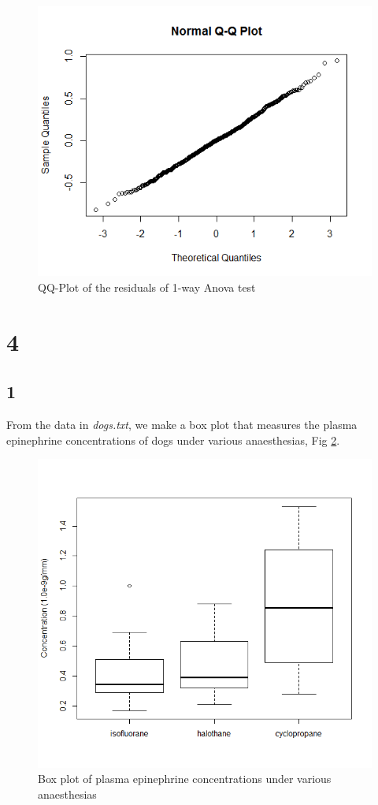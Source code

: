 \documentclass{article}
\begin{document}
    \begin{figure}[H]
    \centering
      \includegraphics[scale=0.4]{../results/3_6.png}
      \caption{QQ-Plot of the residuals of 1-way Anova test}
      \label{fig:qq-resid}
    \end{figure}
    
    \section{4}
    \subsection*{1}
    From the data in \textit{dogs.txt}, we make a box plot that measures the plasma epinephrine concentrations of dogs under various anaesthesias, Fig \ref{fig:dbox}.
    
    \begin{figure}[H]
    \centering
      \includegraphics[scale=0.3]{../results/4_1.png}
      \caption{Box plot of plasma epinephrine concentrations under various anaesthesias}
      \label{fig:dbox}
    \end{figure}
    
\end{document}
